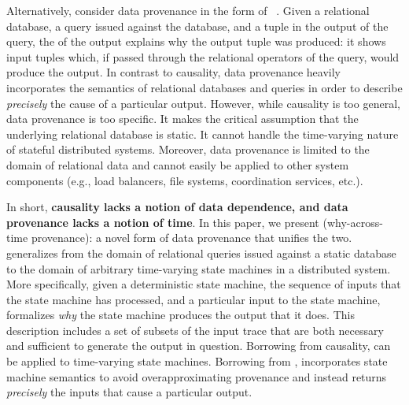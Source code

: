 Alternatively, consider data provenance in the form of
\emph{\whyprovenance{}}~\cite{cheney2009provenance, buneman2001and}. Given a
relational database, a query issued against the database, and a tuple in the
output of the query, the \whyprovenance{} of the output explains     why the
output tuple was produced: it shows input tuples which, if passed through the relational operators of the query, would produce the output. In contrast to causality, data provenance heavily
incorporates the semantics of relational databases and queries in order to
describe \emph{precisely} the cause of a particular output.
However, while
causality is too general, data provenance is too specific. It makes the
critical assumption that the underlying relational database is static.
It
cannot handle the time-varying nature of stateful distributed systems.
Moreover, data provenance is limited to the domain of relational data and
cannot easily be applied to other system components (e.g., load balancers, file
systems, coordination services, etc.).

In short, \textbf{causality lacks a notion of data dependence, and data
provenance lacks a notion of time}. In this paper, we present
 (why-across-time provenance): a novel form of data
provenance that unifies the two. \Watprovenance{} generalizes \whyprovenance{}
from the domain of relational queries issued against a static database to the
domain of arbitrary time-varying state machines in a distributed system. More
specifically, given a deterministic state machine, the sequence of inputs that
the state machine has processed, and a particular input to the state machine,
\watprovenance{} formalizes \emph{why} the state machine produces the output
that it does. This description includes a set of subsets of the input trace
that are both necessary and sufficient to generate the output in question.
Borrowing from causality, \watprovenance{} can be applied to time-varying state
machines.  Borrowing from \whyprovenance{}, \watprovenance{} incorporates state
machine semantics to avoid overapproximating provenance and instead returns
\emph{precisely} the inputs that cause a particular output.

